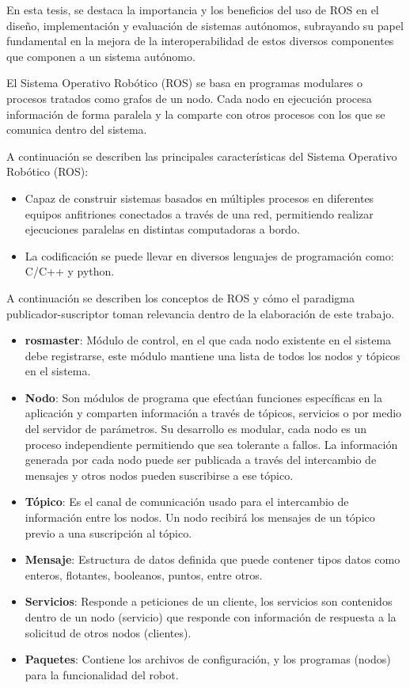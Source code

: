 En esta tesis, se destaca la importancia y los beneficios del uso de ROS en el diseño, implementación y evaluación de sistemas autónomos, subrayando su papel fundamental en la mejora de la interoperabilidad de estos diversos componentes que componen a un sistema autónomo.

El Sistema Operativo Robótico (ROS) se basa en programas modulares o procesos tratados como grafos de un nodo. Cada nodo en ejecución procesa información de forma paralela y la comparte con otros procesos con los que se comunica dentro del sistema.

A continuación se describen las principales características del Sistema Operativo Robótico (ROS):

\begin{itemize}\setlength{\itemsep}{-1mm}
\item Capaz de construir sistemas basados en múltiples procesos en diferentes equipos anfitriones conectados a través de una red, permitiendo realizar ejecuciones paralelas en distintas computadoras a bordo.
\item La codificación se puede llevar en diversos lenguajes de programación como: C/C++ y python.
\end{itemize}

A continuación se describen los conceptos de ROS y cómo el paradigma publicador-suscriptor toman relevancia dentro de la elaboración de este trabajo.


\begin{itemize}\setlength{\itemsep}{-1mm}
\item \textbf{rosmaster}: Módulo de control, en el que cada nodo existente en el sistema debe registrarse, este módulo mantiene una lista de todos los nodos y tópicos en el sistema.
\item \textbf{Nodo}: Son módulos de programa que efectúan funciones específicas en la aplicación y comparten información a través de tópicos, servicios o por medio del servidor de parámetros. Su desarrollo es modular, cada nodo es un proceso independiente permitiendo que sea tolerante a fallos. La información generada por cada nodo puede ser publicada a través del intercambio de mensajes y otros nodos pueden suscribirse a ese tópico.
\item \textbf{Tópico}: Es el canal de comunicación usado para el intercambio de información entre los nodos. Un nodo recibirá los mensajes de un tópico previo a una suscripción al tópico.
\item \textbf{Mensaje}: Estructura de datos definida que puede contener tipos datos como enteros, flotantes, booleanos, puntos, entre otros.
\item \textbf{Servicios}: Responde a peticiones de un cliente, los servicios son contenidos dentro de un nodo (servicio) que responde con información de respuesta a la solicitud de otros nodos (clientes). 
\item \textbf{Paquetes}: Contiene los archivos de configuración, y los programas (nodos) para la funcionalidad del robot.
  
\end{itemize}
